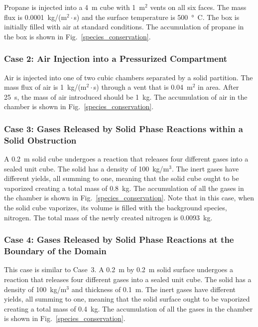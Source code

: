 \documentclass[11pt]{book}
\begin{document}
Propane is injected into a 4~m cube with 1~m$^2$ vents on all six faces.  The mass flux is 0.0001~kg/(m$^2\cdot$s) and the surface temperature is 500~\si{\degree C}.  The box is initially filled with air at standard conditions.  The accumulation of propane in the box is shown in Fig.~\ref{species_conservation}.

\subsubsection{Case 2: Air Injection into a Pressurized Compartment}

 Air is injected into one of two cubic chambers separated by a solid partition.  The mass flux of air is 1~kg/(m$^2\cdot$s) through a vent that is 0.04~m$^2$ in area. After 25~s, the mass of air introduced should be 1~kg. The accumulation of air in the chamber is shown in Fig.~\ref{species_conservation}.

 \subsubsection{Case 3: Gases Released by Solid Phase Reactions within a Solid Obstruction}

 A 0.2~m solid cube undergoes a reaction that releases four different gases into a sealed unit cube. The solid has a density of 100~kg/m$^3$. The inert gases have different yields, all summing to one, meaning that the solid cube ought to be vaporized creating a total mass of 0.8~kg. The accumulation of all the gases in the chamber is shown in Fig.~\ref{species_conservation}. Note that in this case, when the solid cube vaporizes, its volume is filled with the background species, nitrogen. The total mass of the newly created nitrogen is 0.0093~kg.

 \subsubsection{Case 4: Gases Released by Solid Phase Reactions at the Boundary of the Domain}

 This case is similar to Case~3. A 0.2~m by 0.2~m solid surface undergoes a reaction that releases four different gases into a sealed unit cube. The solid has a density of 100~kg/m$^3$ and thickness of 0.1~m. The inert gases have different yields, all summing to one, meaning that the solid surface ought to be vaporized creating a total mass of 0.4~kg. The accumulation of all the gases in the chamber is shown in Fig.~\ref{species_conservation}.
\end{document}
